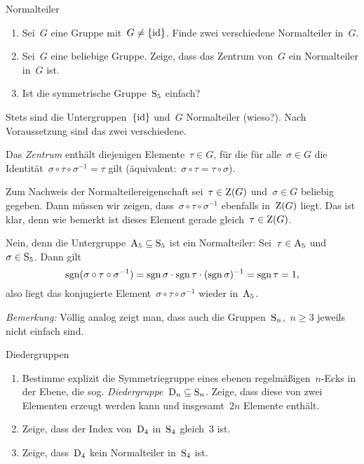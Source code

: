 \documentclass{algblatt}
\begin{document}
\begin{aufgabe}{Normalteiler}
\begin{enumerate}
\item Sei~$G$ eine Gruppe mit~$G \neq \{ \mathrm{id} \}$. Finde
zwei verschiedene Normalteiler in~$G$.
\item Sei~$G$ eine beliebige Gruppe. Zeige, dass das Zentrum von~$G$ ein
Normalteiler in~$G$ ist.
\item Ist die symmetrische Gruppe~$\mathrm{S}_5$ einfach?
\end{enumerate}

\begin{loesungE}
\item Stets sind die Untergruppen~$\{\mathrm{id}\}$ und~$G$ Normalteiler (wieso?). Nach
Voraussetzung sind das zwei verschiedene.

\item Das \emph{Zentrum} enthält diejenigen Elemente~$\tau \in G$, für die für
alle~$\sigma \in G$ die Identität~$\sigma \circ \tau \circ \sigma^{-1} = \tau$
gilt (äquivalent:~$\sigma \circ \tau = \tau \circ \sigma$).

Zum Nachweis der Normalteilereigenschaft sei~$\tau \in \mathrm{Z}(G)$ und~$\sigma \in
G$ beliebig gegeben. Dann müssen wir
zeigen, dass~$\sigma \circ \tau \circ \sigma^{-1}$ ebenfalls in~$\mathrm{Z}(G)$
liegt. Das ist klar, denn wie bemerkt ist dieses Element gerade gleich~$\tau
\in \mathrm{Z}(G)$.

\item Nein, denn die Untergruppe~$\mathrm{A}_5 \subseteq \mathrm{S}_5$ ist ein
Normalteiler: Sei~$\tau \in \mathrm{A}_5$ und~$\sigma \in \mathrm{S}_5$. Dann gilt
\[ \operatorname{sgn}(\sigma \circ \tau \circ \sigma^{-1}) =
  \operatorname{sgn}\sigma \cdot \operatorname{sgn}\tau \cdot (\operatorname{sgn}\sigma)^{-1} =
  \operatorname{sgn}\tau = 1, \]
also liegt das konjugierte Element~$\sigma \circ \tau \circ \sigma^{-1}$ wieder
in~$\mathrm{A}_5$.

\emph{Bemerkung:} Völlig analog zeigt man, dass auch die Gruppen~$\mathrm{S}_n$,~$n
\geq 3$ jeweils nicht einfach sind.
\end{loesungE}
\end{aufgabe}

\begin{aufgabe}{Diedergruppen}
\begin{enumerate}
\item Bestimme explizit die Symmetriegruppe eines ebenen regelmäßigen~$n$-Ecks
in der Ebene, die sog. \emph{Diedergruppe~$\mathrm{D}_n \subseteq \mathrm{S}_n$}. Zeige, dass
diese von zwei Elementen erzeugt werden kann und insgesamt~$2n$ Elemente
enthält.
\item Zeige, dass der Index von~$\mathrm{D}_4$ in~$\mathrm{S}_4$ gleich~$3$ ist.
\item Zeige, dass~$\mathrm{D}_4$ kein Normalteiler in~$\mathrm{S}_4$ ist.
\end{enumerate}
\end{aufgabe}
\end{document}
